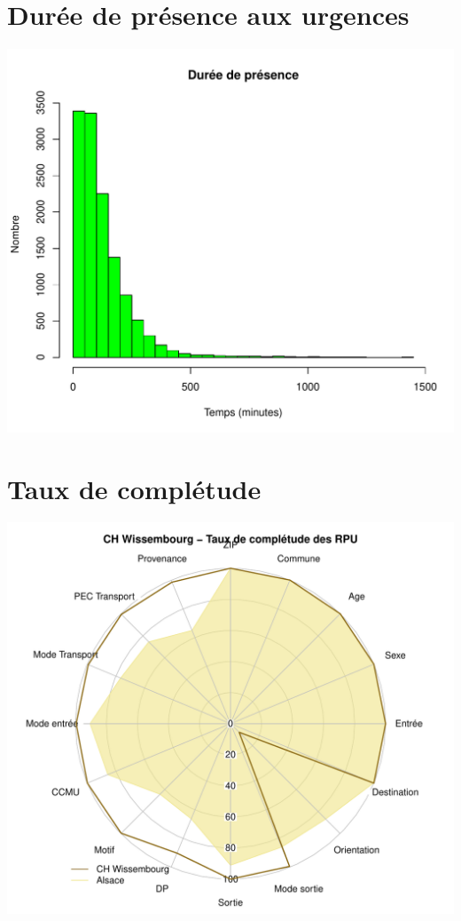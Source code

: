 \documentclass[12pt,english,french,twoside]{book}\usepackage[]{graphicx}\usepackage[]{color}
\makeatletter
\def\maxwidth{ %
  \ifdim\Gin@nat@width>\linewidth
    \linewidth
  \else
    \Gin@nat@width
  \fi
}
\newenvironment{knitrout}{}{} %
\makeatother
\begin{document}
\section*{Durée de présence aux urgences}

\begin{knitrout}
\color{fgcolor}
\includegraphics[width=\maxwidth]{figure/graphe_wis} 

\end{knitrout}


\section*{Taux de complétude}

\begin{knitrout}
\color{fgcolor}
\includegraphics[width=\maxwidth]{figure/compl_wis} 

\end{knitrout}
\end{document}
